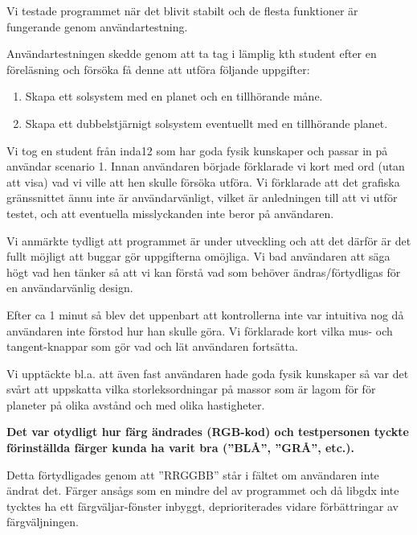 Vi testade programmet när det blivit stabilt och de flesta funktioner
är fungerande genom användartestning.

Användartestningen skedde genom att ta tag i lämplig kth student efter
en föreläsning och försöka få denne att utföra följande uppgifter:
\begin{enumerate}
    \item Skapa ett solsystem med en planet och en tillhörande måne.
    \item Skapa ett dubbelstjärnigt solsystem eventuellt med
        en tillhörande planet.
\end{enumerate}

Vi tog en student från inda12 som har goda fysik kunskaper
och passar in på användar scenario 1.
Innan användaren började förklarade vi kort med ord (utan att visa)
vad vi ville att hen skulle försöka utföra.
Vi förklarade att det grafiska gränssnittet ännu inte är användarvänligt,
vilket är anledningen till att vi utför testet, och att eventuella
misslyckanden inte beror på användaren.

Vi anmärkte tydligt att programmet är under utveckling och
att det därför är det fullt möjligt att buggar gör uppgifterna omöjliga.
Vi bad användaren att säga högt vad hen tänker så att vi kan förstå vad som
behöver ändras/förtydligas för en användarvänlig design.

Efter ca 1 minut så blev det uppenbart att kontrollerna inte var
intuitiva nog då användaren inte förstod hur han skulle göra.
Vi förklarade kort vilka mus- och tangent-knappar som gör vad och
lät användaren fortsätta.


Vi upptäckte bl.a. att även fast användaren hade goda fysik kunskaper så
var det svårt att uppskatta vilka storleksordningar på massor som är
lagom för för planeter på olika avstånd och med olika hastigheter.




\vspace{6pt}

\textbf{Det var otydligt hur färg ändrades (RGB-kod) och testpersonen
tyckte förinställda färger kunda ha varit bra (''BLÅ'', ''GRÅ'', etc.).}

Detta förtydligades genom att ''RRGGBB'' står i fältet om användaren inte
ändrat det. Färger ansågs som en mindre del av programmet och
då libgdx inte tycktes ha ett färgväljar-fönster inbyggt, deprioriterades
vidare förbättringar av färgväljningen.

